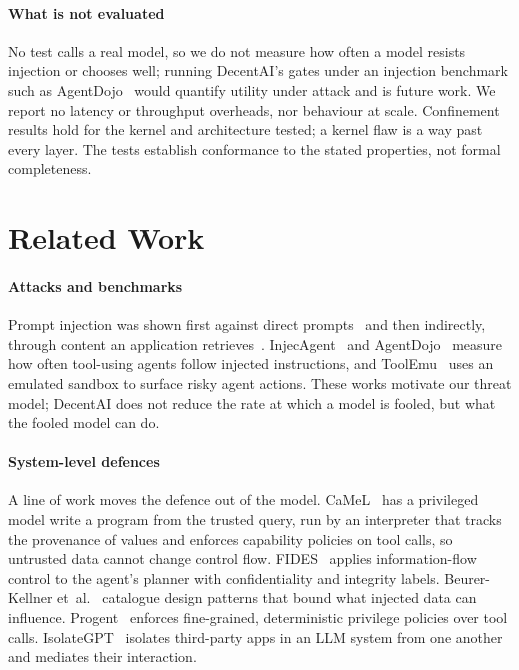 \documentclass[10pt,twocolumn,a4paper]{article}
\newcommand{\sys}{DecentAI}
\begin{document}
\paragraph{What is not evaluated}
No test calls a real model, so we do not measure how often a model
resists injection or chooses well; running \sys{}'s gates under an
injection benchmark such as AgentDojo~\cite{debenedetti2024agentdojo}
would quantify utility under attack and is future work. We report no
latency or throughput overheads, nor behaviour at scale. Confinement
results hold for the kernel and architecture tested; a kernel flaw is
a way past every layer. The tests establish conformance to the stated
properties, not formal completeness.

\section{Related Work}
\label{sec:related}

\paragraph{Attacks and benchmarks}
Prompt injection was shown first against direct
prompts~\cite{perez2022ignore} and then indirectly, through content an
application retrieves~\cite{greshake2023indirect}. InjecAgent~\cite{zhan2024injecagent}
and AgentDojo~\cite{debenedetti2024agentdojo} measure how often
tool-using agents follow injected instructions, and
ToolEmu~\cite{ruan2024toolemu} uses an emulated sandbox to surface
risky agent actions. These works motivate our threat model; \sys{} does
not reduce the rate at which a model is fooled, but what the fooled
model can do.

\paragraph{System-level defences}
A line of work moves the defence out of the model. CaMeL~\cite{debenedetti2025camel}
has a privileged model write a program from the trusted query, run by
an interpreter that tracks the provenance of values and enforces
capability policies on tool calls, so untrusted data cannot change
control flow. FIDES~\cite{costa2025fides} applies information-flow
control to the agent's planner with confidentiality and integrity
labels. Beurer-Kellner et~al.~\cite{beurerkellner2025patterns} catalogue
design patterns that bound what injected data can influence.
Progent~\cite{shi2025progent} enforces fine-grained, deterministic
privilege policies over tool calls. IsolateGPT~\cite{wu2025isolategpt}
isolates third-party apps in an LLM system from one another and
mediates their interaction.
\end{document}
